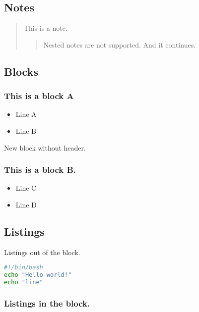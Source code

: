 \documentclass[
  11pt,
]{article}
\providecommand{\tightlist}{%
  \setlength{\itemsep}{0pt}\setlength{\parskip}{0pt}}
\begin{document}
\subsection{Notes}\label{notes}

\begin{quote}
This is a note.

\begin{quote}
Nested notes are not supported. And it continues.
\end{quote}
\end{quote}

\subsection{Blocks}\label{blocks}

\subsubsection{This is a block A}\label{this-is-a-block-a}

\begin{itemize}
\tightlist
\item
  Line A
\item
  Line B
\end{itemize}

New block without header.

\subsubsection{This is a block B.}\label{this-is-a-block-b.}

\begin{itemize}
\tightlist
\item
  Line C
\item
  Line D
\end{itemize}

\subsection{Listings}\label{listings}

Listings out of the block.

\begin{lstlisting}[language=sh]
#!/bin/bash
echo "Hello world!"
echo "line"
\end{lstlisting}

\subsubsection{Listings in the block.}\label{listings-in-the-block.}
\end{document}
